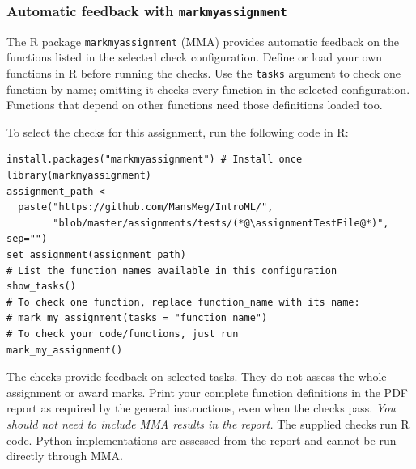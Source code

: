 \subsubsection*{Automatic feedback with \texttt{markmyassignment}}

The R package \texttt{markmyassignment} (MMA) provides automatic feedback on the functions listed in the selected check configuration. Define or load your own functions in R before running the checks. Use the \texttt{tasks} argument to check one function by name; omitting it checks every function in the selected configuration. Functions that depend on other functions need those definitions loaded too.

To select the checks for this assignment, run the following code in R:

\begingroup
{}
\begin{lstlisting}
install.packages("markmyassignment") # Install once
library(markmyassignment)
assignment_path <-
  paste("https://github.com/MansMeg/IntroML/",
        "blob/master/assignments/tests/(*@\assignmentTestFile@*)", sep="")
set_assignment(assignment_path)
# List the function names available in this configuration
show_tasks()
# To check one function, replace function_name with its name:
# mark_my_assignment(tasks = "function_name")
# To check your code/functions, just run
mark_my_assignment()
\end{lstlisting}
\endgroup

The checks provide feedback on selected tasks. They do not assess the whole assignment or award marks. Print your complete function definitions in the PDF report as required by the general instructions, even when the checks pass. \emph{You should not need to include MMA results in the report.} The supplied checks run R code. Python implementations are assessed from the report and cannot be run directly through MMA.
